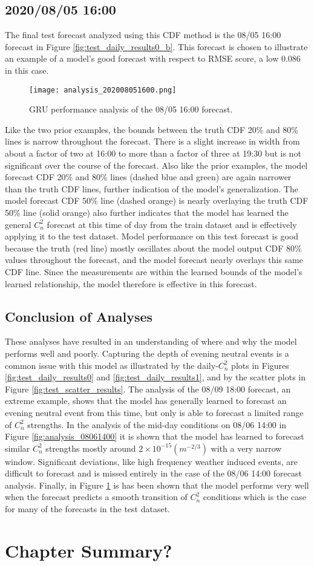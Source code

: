 \subsection{2020/08/05 16:00}
The final test forecast analyzed using this CDF method is the 08/05 16:00 forecast in Figure \ref{fig:test_daily_results0_b}. This forecast is chosen to illustrate an example of a model's good forecast with respect to RMSE score, a low 0.086 in this case.
\begin{figure}[h!]
	\centering
	\texttt{[image: analysis\_202008051600.png]}
	\caption{GRU performance analysis of the 08/05 16:00 forecast.}
	\label{fig:analysis_08051600}
\end{figure}
Like the two prior examples, the bounds between the truth CDF 20\% and 80\% lines is narrow throughout the forecast. There is a slight increase in width from about a factor of two at 16:00 to more than a factor of three at 19:30 but is not significant over the course of the forecast. Also like the prior examples, the model forecast CDF 20\% and 80\% lines (dashed blue and green) are again narrower than the truth CDF lines, further indication of the model's generalization. The model forecast CDF 50\% line (dashed orange) is nearly overlaying the truth CDF 50\% line (solid orange) also further indicates that the model has learned the general $C_{n}^{2}$ forecast at this time of day from the train dataset and is effectively applying it to the test dataset. Model performance on this test forecast is good because the truth (red line) mostly oscillates about the model output CDF 80\% values throughout the forecast, and the model forecast nearly overlays this same CDF line. Since the measurements are within the learned bounds of the model's learned relationship, the model therefore is effective in this forecast.

\subsection{Conclusion of Analyses}
These analyses have resulted in an understanding of where and why the model performs well and poorly. Capturing the depth of evening neutral events is a common issue with this model as illustrated by the daily-$C_{n}^{2}$ plots in Figures \ref{fig:test_daily_results0} and \ref{fig:test_daily_results1}, and by the scatter plots in Figure \ref{fig:test_scatter_results}. The analysis of the 08/09 18:00 forecast, an extreme example, shows that the model has generally learned to forecast an evening neutral event from this time, but only is able to forecast a limited range of $C_{n}^{2}$ strengths. In the analysis of the mid-day conditions on 08/06 14:00 in Figure \ref{fig:analysis_08061400} it is shown that the model has learned to forecast similar $C_{n}^{2}$ strengths mostly around $2 \times 10^{-15} (m^{-2/3})$ with a very narrow window. Significant deviations, like high frequency weather induced events, are difficult to forecast and is missed entirely in the case of the 08/06 14:00 forecast analysis. Finally, in Figure \ref{fig:analysis_08051600} is has been shown that the model performs very well when the forecast predicts a smooth transition of $C_{n}^{2}$ conditions which is the case for many of the forecasts in the test dataset. 

\section{Chapter Summary?}